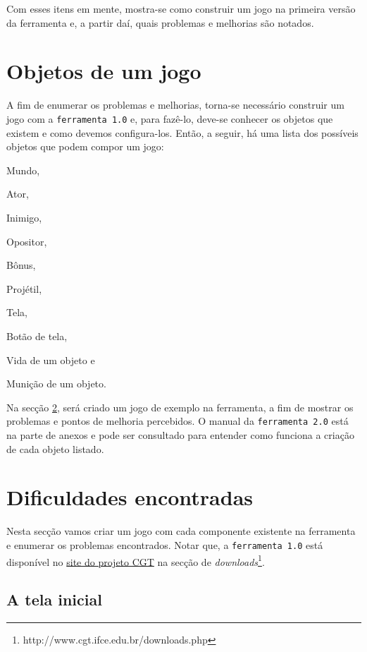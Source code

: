 \documentclass[12pt,twoside,openright,a4paper,english,brazil,sumario=tradicional]{abntex2}
\begin{document}
Com esses itens em mente, mostra-se como construir um jogo na primeira versão da ferramenta e, a partir daí, quais problemas e melhorias são notados.

\section{Objetos de um jogo}
\label{sec:objetos}

A fim de enumerar os problemas e melhorias, torna-se necessário construir um jogo com a \texttt{ferramenta 1.0} e, para fazê-lo, deve-se conhecer os objetos que existem e como devemos configura-los. Então, a seguir, há uma lista dos possíveis objetos que podem compor um jogo:

\begin{alineas}
	\item Mundo,
	\item Ator,
	\item Inimigo,
	\item Opositor,
	\item Bônus,
	\item Projétil,
	\item Tela,
	\item Botão de tela,
	\item Vida de um objeto e
	\item Munição de um objeto.
\end{alineas}

Na secção \ref{sec:dificuldades}, será criado um jogo de exemplo na ferramenta, a fim de mostrar os problemas e pontos de melhoria percebidos. O manual da \texttt{ferramenta 2.0} está na parte de anexos e pode ser consultado para entender como funciona a criação de cada objeto listado.

\section{Dificuldades encontradas}
\label{sec:dificuldades}
Nesta secção vamos criar um jogo com cada componente existente na ferramenta e enumerar os problemas encontrados. Notar que, a \texttt{ferramenta 1.0} está disponível no \href{http://www.cgt.ifce.edu.br/downloads.php}{site do projeto CGT} na secção de \emph{downloads}\footnote{http://www.cgt.ifce.edu.br/downloads.php}.

\subsection{A tela inicial}
\end{document}

